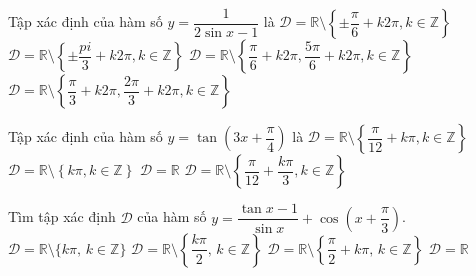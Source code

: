 \begin{ex}%
	Tập xác định của hàm số $y=\dfrac{1}{2\sin x-1}$  là
	 \choice
		{$\mathscr{D}=\mathbb{R}\setminus\left\{\pm\dfrac{\pi}{6}+k2\pi ,k\in\mathbb{Z}\right\}$} 
		 {$\mathscr{D}=\mathbb{R}\setminus\left\{\pm\dfrac{pi}{3}+k2\pi ,k\in\mathbb{Z}\right\}$}
		{\True $\mathscr{D}=\mathbb{R}\setminus\left\{\dfrac{\pi}{6}+k2\pi ,\dfrac{5\pi}{6}+k2\pi ,k\in\mathbb{Z}\right\}$} 
		{$\mathscr{D}=\mathbb{R}\setminus\left\{\dfrac{\pi}{3}+k2\pi ,\dfrac{2\pi}{3}+k2\pi  ,k\in\mathbb{Z}\right\}$}
\end{ex}

\begin{ex}%
	Tập xác định của hàm số $y=\tan  \left(3x+\dfrac{\pi}{4} \right)$ là
	 \choice
		{$\mathscr{D}=\mathbb{R}\setminus \left\{\dfrac{\pi}{12}+k\pi,k\in  \mathbb{Z}\right\}$}
		{$\mathscr{D}=\mathbb{R}\setminus \left\{k\pi,k\in \mathbb{Z}\right\}$} 
		 {$\mathscr{D}=\mathbb{R}$}
		{\True $\mathscr{D}=\mathbb{R}\setminus \left\{\dfrac{\pi}{12}+\dfrac{k\pi}{3},k\in  \mathbb{Z}\right\}$}
\end{ex}

\begin{ex}%
	Tìm tập xác định  $\mathscr{D}$ của hàm số $y=\dfrac{\tan x-1}{\sin x}+\cos\left(x+\dfrac{\pi}{3}\right)$.
	 \choice
		 {$\mathscr{D}=\mathbb{R}\setminus\{k\pi,\, k\in\mathbb{Z}\}$}
		{\True $\mathscr{D}=\mathbb{R}\setminus\left\{\dfrac{k\pi}{2},\, k\in\mathbb{Z}\right\}$} 
		{$\mathscr{D}=\mathbb{R}\setminus\left\{\dfrac{\pi}{2}+k\pi,\,  k\in\mathbb{Z}\right\}$}
		{$\mathscr{D}=\mathbb{R}$} 
\end{ex}

